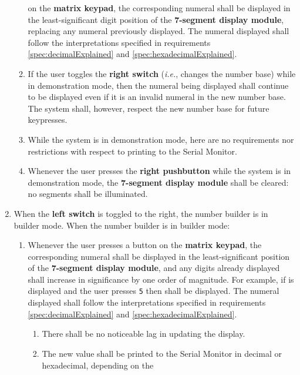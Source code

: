 \begin{enumerate}
\begin{enumerate}
        on the \textbf{matrix keypad}, the corresponding numeral shall be
        displayed in the least-significant digit position of the
        \textbf{7-segment display module}, replacing any numeral previously
        displayed. The numeral displayed shall follow the interpretations
        specified in requirements \ref{spec:decimalExplained} and
        \ref{spec:hexadecimalExplained}.
    \item If the user toggles the \textbf{right switch} (\textit{i.e.}, changes
        the number base) while in demonstration mode, then the numeral being
        displayed shall continue to be displayed even if it is an invalid
        numeral in the new number base. The system shall, however, respect the
        new number base for future keypresses.
    \item While the system is in demonstration mode, here are no requirements
        nor restrictions with respect to printing to the Serial Monitor.
    \item Whenever the user presses the \textbf{right pushbutton} while the
        system is in demonstration mode, the \textbf{7-segment display module}
        shall be cleared: no segments shall be illuminated.
    \end{enumerate}
\item \label{spec:ConversionMode} When the \textbf{left switch} is toggled to
    the right, the number builder is in builder mode. When the number builder
    is in builder mode:
    \begin{enumerate}
    \item \label{spec:BuildingValue} Whenever the user presses a button on the
        \textbf{matrix keypad}, the corresponding numeral shall be displayed in
        the least-significant position of the \textbf{7-segment display
        module}, and any digits already displayed shall increase in
        significance by one order of magnitude. For example, if {}
        is displayed and the user presses \texttt{5} then {} shall
        be displayed. The numeral displayed shall follow the interpretations
        specified in requirements \ref{spec:decimalExplained} and
        \ref{spec:hexadecimalExplained}.
        \begin{enumerate}
        \item There shall be no noticeable lag in updating the display.
        \item \label{spec:printValueToConsole} The new value shall be printed
            to the Serial Monitor in decimal or hexadecimal, depending on the

\end{enumerate}
\end{enumerate}
\end{enumerate}
